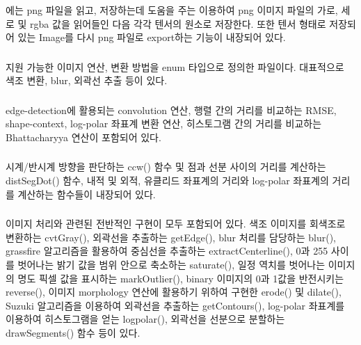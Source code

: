 \documentclass[conference]{IEEEtran}
\begin{document}
\subsubsection{\egLoader}

\egLoader 에는 png 파일을 읽고, 저장하는데 도움을 주는  이용하여 png 이미지 파일의 가로, 세로 및 rgba 값을 읽어들인 다음 각각 텐서의 원소로 저장한다.
또한 \Eigen 텐서 형태로 저장되어 있는 Image를 다시 png 파일로 export하는 기능이 내장되어 있다.

\subsubsection{\egMethods}

 지원 가능한 이미지 연산, 변환 방법을 enum 타입으로 정의한 파일이다.
대표적으로 색조 변환, blur, 외곽선 추출 등이 있다.

\subsubsection{\egMath}

 edge-detection에 활용되는 convolution 연산, 행렬 간의 거리를 비교하는 RMSE, shape-context, log-polar 좌표계 변환 연산, 히스토그램 간의 거리를 비교하는 Bhattacharyya 연산이 포함되어 있다.

\subsubsection{\egGeometry}

 시계/반시계 방향을 판단하는 ccw() 함수 및 점과 선분 사이의 거리를 계산하는 distSegDot() 함수, 내적 및 외적, 유클리드 좌표계의 거리와 log-polar 좌표계의 거리를 계산하는 함수들이 내장되어 있다. 

\subsubsection{\egProcessing}

 이미지 처리와 관련된 전반적인 구현이 모두 포함되어 있다.
색조 이미지를 회색조로 변환하는 cvtGray(),
외곽선을 추출하는 getEdge(),
blur 처리를 담당하는 blur(),
grassfire 알고리즘\cite{grassfire}을 활용하여 중심선을 추출하는 extractCenterline(),
0과 255 사이를 벗어나는 밝기 값을 범위 안으로 축소하는 saturate(),
일정 역치를 벗어나는 이미지의 명도 픽셀 값을 표시하는 markOutlier(),
binary 이미지의 0과 1값을 반전시키는 reverse(),
이미지 morphology 연산에 활용하기 위하여 구현한 erode() 및 dilate(),
Suzuki 알고리즘을 이용하여 외곽선을 추출하는 getContours(),
log-polar 좌표계를 이용하여 히스토그램을 얻는 logpolar(),
외곽선을 선분으로 분할하는 drawSegments() 함수 등이 있다.
\end{document}
